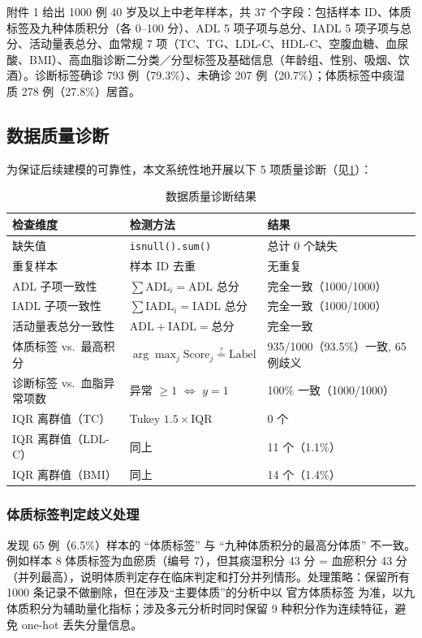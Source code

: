 \documentclass{MathorCupmodeling}
\begin{document}
附件 1 给出 1000 例 40 岁及以上中老年样本，共 37 个字段：包括样本 ID、体质标签及九种体质积分（各 0--100 分）、ADL 5 项子项与总分、IADL 5 项子项与总分、活动量表总分、血常规 7 项（TC、TG、LDL-C、HDL-C、空腹血糖、血尿酸、BMI）、高血脂诊断二分类／分型标签及基础信息（年龄组、性别、吸烟、饮酒）。诊断标签确诊 793 例（79.3\%）、未确诊 207 例（20.7\%）；体质标签中痰湿质 278 例（27.8\%）居首。

\subsection{数据质量诊断}

为保证后续建模的可靠性，本文系统性地开展以下 5 项质量诊断（见\cref{tab:quality}）：

\begin{table}[H]
\centering\small
\caption{数据质量诊断结果}\label{tab:quality}
\begin{tabular}{@{}l l l@{}}
\toprule
检查维度 & 检测方法 & 结果 \\
\midrule
缺失值 & \texttt{isnull().sum()} & 总计 0 个缺失 \\
重复样本 & 样本 ID 去重 & 无重复 \\
ADL 子项一致性 & $\sum \text{ADL}_i = \text{ADL 总分}$ & 完全一致（1000/1000） \\
IADL 子项一致性 & $\sum \text{IADL}_i = \text{IADL 总分}$ & 完全一致（1000/1000） \\
活动量表总分一致性 & $\text{ADL}+\text{IADL} = \text{总分}$ & 完全一致 \\
体质标签 vs.~最高积分 & $\arg\max_{j} \text{Score}_j \stackrel{?}{=} \text{Label}$ & 935/1000（93.5\%）一致, 65 例歧义 \\
诊断标签 vs.~血脂异常项数 & 异常 $\ge 1$ $\Leftrightarrow$ $y=1$ & 100\% 一致（1000/1000） \\
IQR 离群值（TC） & Tukey $1.5\times$IQR & 0 个 \\
IQR 离群值（LDL-C） & 同上 & 11 个（1.1\%） \\
IQR 离群值（BMI） & 同上 & 14 个（1.4\%） \\
\bottomrule
\end{tabular}
\end{table}

\subsubsection{体质标签判定歧义处理}

发现 65 例（6.5\%）样本的 ``体质标签'' 与 ``九种体质积分的最高分体质'' 不一致。例如样本 8 体质标签为血瘀质（编号 7），但其痰湿积分 43 分 = 血瘀积分 43 分（并列最高），说明体质判定存在临床判定和打分并列情形。处理策略：保留所有 1000 条记录不做删除，但在涉及``主要体质''的分析中以 官方体质标签 为准，以九体质积分为辅助量化指标；涉及多元分析时同时保留 9 种积分作为连续特征，避免 one-hot 丢失分量信息。
\end{document}
